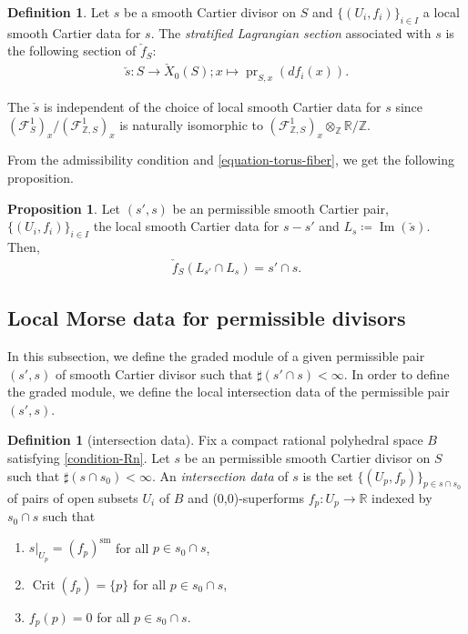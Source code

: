 \documentclass[a4paper,dvipdfmx,reqno,12pt]{amsart}
\theoremstyle{definition}
\newtheorem{definition}[theorem]{Definition}
\newtheorem{proposition}[theorem]{Proposition}
\newcommand{\deq}{\coloneqq}
\newcommand{\opn}[1]{\operatorname{#1}}
\numberwithin{equation}{section}
\begin{document}
\begin{definition}
Let $s$ be a smooth 
Cartier divisor on $S$ and $\{(U_i,f_i)\}_{i\in I}$ a local
smooth Cartier data for $s$. 
The \emph{stratified Lagrangian section} associated with $s$ is the following
section of $\check{f}_S$:
\begin{align}
\check{s}\colon S \to \check{X}_0(S); x \mapsto \opn{pr}_{S,x} (df_i(x)).
\end{align}
\end{definition}

The $\check{s}$ is independent of the choice of local 
smooth Cartier data for $s$ since 
$(\mathcal{F}^{1}_{S})_x/(\mathcal{F}^{1}_{\mathbb{Z},S})_x$
is naturally isomorphic to
$(\mathcal{F}^{1}_{\mathbb{Z},S})_x
\otimes_{\mathbb{Z}}\mathbb{R}/\mathbb{Z}$.
 

From the admissibility condition and
\cref{equation-torus-fiber}, we get the following proposition.

\begin{proposition}
Let $(s',s)$ be an permissible smooth Cartier pair, 
$\{(U_i,f_i)\}_{i\in I}$ the local smooth Cartier data 
for $s-s'$ and $L_s\deq \opn{Im}(\check{s})$.
Then,
\begin{align}
\check{f}_S(L_{s'}\cap L_s)=s'\cap s.
\end{align}

\end{proposition}






 
\subsection{Local Morse data for permissible divisors}

In this subsection, we
define the graded module of a given permissible pair 
$(s',s)$ of smooth Cartier divisor such that 
$\sharp (s'\cap s)<\infty$.
In order to define the graded module, we define the 
local intersection data of 
the permissible pair $(s',s)$.

\begin{definition}[{intersection data}]
Fix a compact rational polyhedral space $B$ satisfying 
\cref{condition-Rn}.
Let $s$ be an permissible smooth Cartier divisor 
on $S$ such that $\sharp (s\cap s_0)<\infty$. 
An \emph{intersection data} of $s$ is the set 
$\{(U_p,f_p)\}_{p\in s\cap s_0}$ of pairs of open subsets
$U_i$ of $B$ and (0,0)-superforms
$f_p\colon U_p \to \mathbb{R}$ indexed by 
$ s_0\cap s$ 
such that
\begin{enumerate}
\item $s|_{U_p}=(f_p)^{\mathrm{sm}}$
for all $p\in s_0\cap s$,
\item $\opn{Crit}(f_p)=\{p\}$ for all $p\in s_0\cap s$,
\item $f_p(p)=0$ for all $p\in s_0\cap s$.
\end{enumerate}
\end{definition}
\end{document}
